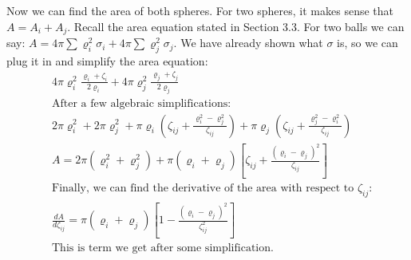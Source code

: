 \documentclass{article}
\begin{document}
Now we can find the area of both spheres. For two spheres, it makes sense that $A = A_i + A_j$. Recall the area equation stated in Section 3.3. For two balls we can say: $A = 4\pi\sum{\varrho_i^2\sigma_i} + 4\pi\sum{\varrho_j^2\sigma_j}$. We have already shown what $\sigma$ is, so we can plug it in and simplify the area equation:
\begin{align*}
&4\pi\varrho_i^2\frac{\varrho_i + \zeta_i}{2\varrho_i} + 4\pi\varrho_j^2\frac{\varrho_j + \zeta_j}{2\varrho_j} \\
&\text{After a few algebraic simplifications:} \\
&2\pi\varrho_i^2 +2\pi\varrho_j^2 +\pi\varrho_i\left(\zeta_{ij} + \frac{\varrho_i^2 - \varrho_j^2}{\zeta_{ij}}\right)+\pi\varrho_j\left(\zeta_{ij} + \frac{\varrho_j^2 - \varrho_i^2}{\zeta_{ij}}\right) \\
&A  = 2\pi(\varrho_i^2 + \varrho_j^2) + \pi(\varrho_i+\varrho_j)\left[\zeta_{ij}+\frac{(\varrho_i-\varrho_j)^2}{\zeta_{ij}}\right] \\
&\text{Finally, we can find the derivative of the area with respect to $\zeta_{ij}$:} \\
&\frac{dA}{d\zeta_{ij}} = \pi(\varrho_i+\varrho_j)\left[1-\frac{(\varrho_i - \varrho_j)^2}{\zeta_{ij}^2}\right] \\
&\text{This is term we get after some simplification.}
\end{align*}
\end{document}
